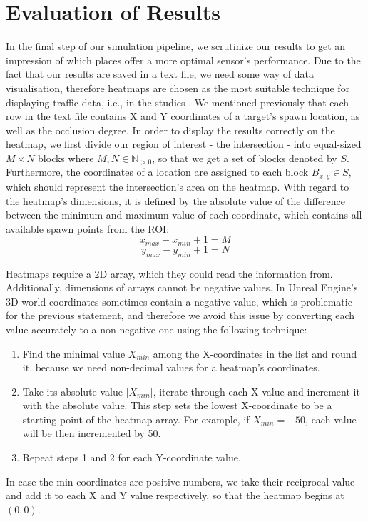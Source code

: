  \section{Evaluation of Results}
 In the final step of our simulation pipeline, we scrutinize our results to get an impression of which places offer a more optimal sensor's performance. Due to the fact that our results are saved in a text file, we need some way of data visualisation, therefore heatmaps are chosen as the most suitable technique for displaying traffic data, i.e., in the studies \cite{heatmap_first, heatmap_second}. We mentioned previously that each row in the text file contains X and Y coordinates of a target's spawn location, as well as the occlusion degree. In order to display the results correctly on the heatmap, we first divide our region of interest - the intersection - into equal-sized $M \times N$ blocks where $M,N \in \mathbb{N}_{>0}$, so that we get a set of blocks denoted by $S$. Furthermore, the coordinates of a location are assigned to each block $B_{x,y} \in S$, which should represent the intersection's area on the heatmap. With regard to the heatmap's dimensions, it is defined by the absolute value of the difference between the minimum and maximum value of each coordinate, which contains all available spawn points from the ROI:
 \begin{equation}
     x_{max} - x_{min} + 1 = M
 \end{equation}
 \begin{equation}
     y_{max} - y_{min} + 1 = N
 \end{equation}
 
 Heatmaps require a 2D array, which they could read the information from. Additionally, dimensions of arrays cannot be negative values. In Unreal Engine's 3D world coordinates sometimes contain a negative value, which is problematic for the previous statement, and therefore we avoid this issue by converting each value accurately to a non-negative one using the following technique:
 \begin{enumerate}
     \item Find the minimal value $X_{min}$ among the X-coordinates in the list and round it, because we need non-decimal values for a heatmap's coordinates.
     \item Take its absolute value $|X_{min}|$, iterate through each X-value and increment it with the absolute value. This step sets the lowest X-coordinate to be a starting point of the heatmap array. For example, if $X_{min} = -50$, each value will be then incremented by 50.  
     \item Repeat steps 1 and 2 for each Y-coordinate value.
 \end{enumerate}
 In case the min-coordinates are positive numbers, we take their reciprocal value and add it to each X and Y value respectively, so that the heatmap begins at $(0,0)$.
 
